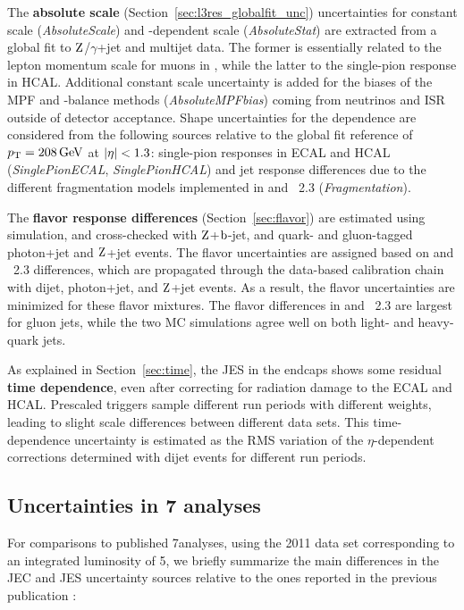 \documentclass[11pt,twoside,a4paper,cmspaper,final,collab]{cms-tdr}
\begin{document}
The \textbf{absolute scale} (Section~\ref{sec:l3res_globalfit_unc}) uncertainties for constant scale (\textit{AbsoluteScale}) and \pt-dependent scale (\textit{AbsoluteStat}) are extracted from a global fit to $\mathrm{Z}$/$\gamma$+jet and multijet data. The former is essentially related to the lepton momentum scale for muons in \zmmjet, while the latter to the single-pion response in HCAL. Additional constant scale uncertainty is added for the biases of the MPF and \pt-balance methods (\textit{AbsoluteMPFbias}) coming from neutrinos and ISR outside of detector acceptance.
Shape uncertainties for the \pt dependence are considered from the following sources relative to the global fit reference of $p_{\mathrm{T}}=208\,\text{Ge\hspace{-.08em}V}$ at $\lvert \eta \rvert<1.3$: single-pion responses in ECAL and HCAL (\textit{SinglePionECAL}, \textit{Single\-Pion\-HCAL}) and jet response differences due to the different fragmentation models implemented in  and \HERWIGpp~2.3 (\textit{Fragmentation}).

The \textbf{flavor response differences} (Section~\ref{sec:flavor}) are estimated using simulation, and cross-checked with $\mathrm{Z}$+$\mathrm{b}$-jet, and quark- and gluon-tagged photon+jet and $\mathrm{Z}$+jet events. The flavor uncertainties are assigned based on  and \HERWIGpp~2.3 differences, which are propagated through the data-based calibration chain with dijet, photon+jet, and $\mathrm{Z}$+jet events. As a result, the flavor uncertainties are minimized for these flavor mixtures. The flavor differences in  and \HERWIGpp~2.3 are largest for gluon jets, while the two MC simulations agree well on both light- and heavy-quark jets.

As explained in Section~\ref{sec:time}, the JES in the endcaps shows some residual \textbf{time dependence}, even after correcting for radiation damage to the ECAL and HCAL. Prescaled triggers sample different run periods with different weights, leading to slight scale differences between different data sets. This time-dependence uncertainty is estimated as the RMS variation of the $\eta$-dependent corrections determined with dijet events for different run periods.

\subsection{Uncertainties in \texorpdfstring{7\TeV}{7 TeV} analyses}

For comparisons to published 7\TeV analyses, using the 2011 data set corresponding to an integrated luminosity of 5\fbinv, we briefly summarize the main differences in the JEC and JES uncertainty sources relative to the ones reported in the previous publication \cite{JEC_JINST}:
\end{document}
